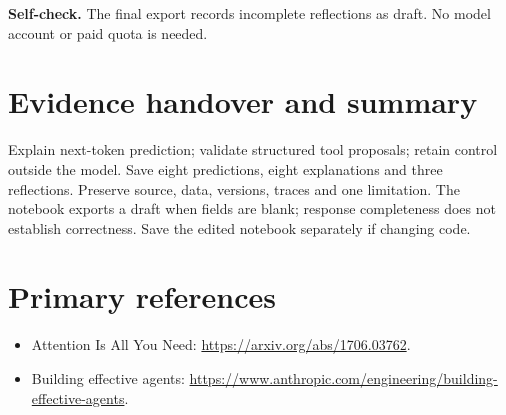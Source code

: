 \textbf{Self-check.} The final export records incomplete reflections as draft. No model account or paid quota is needed.
\section{Evidence handover and summary}
Explain next-token prediction; validate structured tool proposals; retain control outside the model. Save eight predictions, eight explanations and three reflections. Preserve source, data, versions, traces and one limitation. The notebook exports a draft when fields are blank; response completeness does not establish correctness. Save the edited notebook separately if changing code.
\section{Primary references}
\begin{itemize}
\item Attention Is All You Need: \url{https://arxiv.org/abs/1706.03762}.
\item Building effective agents: \url{https://www.anthropic.com/engineering/building-effective-agents}.
\end{itemize}
